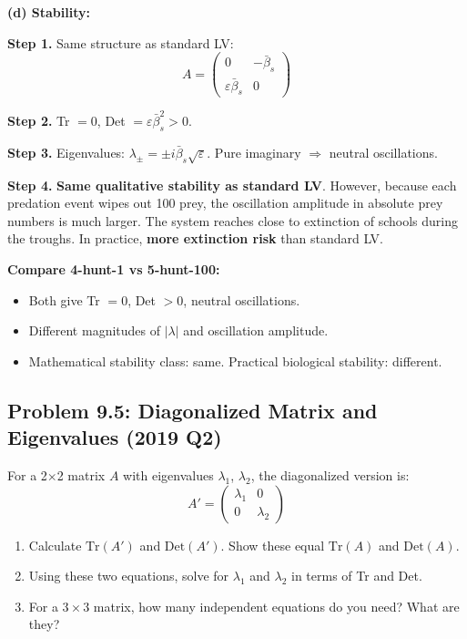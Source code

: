 \documentclass[10pt]{article}
\begin{document}
\begin{solution}
\medskip\textbf{(d) Stability:}

\textbf{Step 1.} Same structure as standard LV:
\[
A = \begin{pmatrix} 0 & -\bar\beta_s \\ \varepsilon\bar\beta_s & 0 \end{pmatrix}
\]

\textbf{Step 2.} Tr $= 0$, Det $= \varepsilon\bar\beta_s^2 > 0$.

\textbf{Step 3.} Eigenvalues: $\lambda_\pm = \pm i\bar\beta_s\sqrt\varepsilon$. Pure imaginary $\Rightarrow$ neutral oscillations.

\textbf{Step 4.} \textbf{Same qualitative stability as standard LV}. However, because each predation event wipes out 100 prey, the oscillation amplitude in absolute prey numbers is much larger. The system reaches close to extinction of schools during the troughs. In practice, \textbf{more extinction risk} than standard LV.

\textbf{Compare 4-hunt-1 vs 5-hunt-100:}
\begin{itemize}
\item Both give Tr $= 0$, Det $> 0$, neutral oscillations.
\item Different magnitudes of $|\lambda|$ and oscillation amplitude.
\item Mathematical stability class: same. Practical biological stability: different.
\end{itemize}
\end{solution}

\subsection{Problem 9.5: Diagonalized Matrix and Eigenvalues (2019 Q2)}

\begin{problem}
For a 2$\times$2 matrix $A$ with eigenvalues $\lambda_1$, $\lambda_2$, the diagonalized version is:
\[
A' = \begin{pmatrix} \lambda_1 & 0 \\ 0 & \lambda_2 \end{pmatrix}
\]
\begin{enumerate}[label=(\alph*)]
\item Calculate $\text{Tr}(A')$ and $\text{Det}(A')$. Show these equal $\text{Tr}(A)$ and $\text{Det}(A)$.
\item Using these two equations, solve for $\lambda_1$ and $\lambda_2$ in terms of Tr and Det.
\item For a $3\times3$ matrix, how many independent equations do you need? What are they?
\end{enumerate}
\end{problem}
\end{document}
